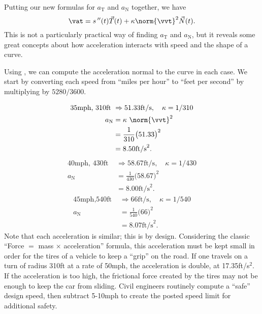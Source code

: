 Putting our new formulas for $a_\text{T}$ and $a_\text{N}$ together, we have 
$$\vat = s\,''(t)\vec T(t) + \kappa\norm{\vvt}^2\vec N(t).$$
This is not a particularly practical way of finding $a_\text{T}$ and $a_\text{N}$, but it reveals some great concepts about how acceleration interacts with speed and the shape of a curve.

{
Using , we can compute the acceleration normal to the curve in each case. We start by converting each speed from ``miles per hour'' to ``feet per second'' by multiplying by $5280/3600$.

\begin{align*}
\text{35mph, 310ft } &\Rightarrow 51.33\text{ft/s},\quad \kappa = 1/310 \\
			a_\text{N}&= \kappa\ \norm{\vvt}^2\\ 
							&= \frac1{310}\big(51.33\big)^2 \\
							&= 8.50\text{ft/s}^2.
\end{align*}
\begin{align*}
\text{40mph, 430ft } &\Rightarrow 58.67\text{ft/s},\quad \kappa = 1/430 \\
			a_\text{N}&= \frac1{430}\big(58.67\big)^2 \\
							&= 8.00\text{ft/s}^2.
\end{align*}
\begin{align*}
\text{45mph,540ft } &\Rightarrow 66\text{ft/s},\quad \kappa = 1/540 \\
			a_\text{N}&= \frac1{540}\big(66\big)^2 \\
							&= 8.07\text{ft/s}^2.
\end{align*}
Note that each acceleration is similar; this is by design. Considering the classic ``Force $=$ mass $\times$ acceleration'' formula, this acceleration must be kept small in order for the tires of a vehicle to keep a ``grip'' on the road. If one travels on a turn of radius 310ft at a rate of 50mph, the acceleration is double, at 17.35ft/s$^2$. If the acceleration is too high, the frictional force created by the tires may not be enough to keep the car from sliding. Civil engineers routinely compute a ``safe'' design speed, then subtract 5-10mph to create the posted speed limit for additional safety.}

